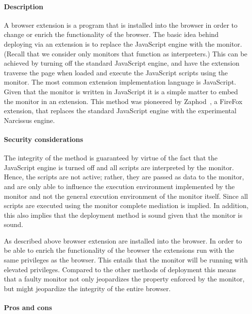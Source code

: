 \documentclass{llncs}
\begin{document}
\paragraph{Description}

A browser extension is a program that is installed into the browser in order to
change or enrich the functionality of the browser.  The basic idea behind
deploying via an extension is to replace the JavaScript engine with the monitor.
(Recall that we consider only monitors that function as interpreters.)
%
This can be achieved by turning off the standard JavaScript engine, and have
the extension traverse the page when loaded and execute the JavaScript scripts
using the monitor. 
%
The most common extension implementation language is JavaScript. Given that
the monitor is written in JavaScript it is a simple matter to embed the 
monitor in an extension.
This method was pioneered by Zaphod~\cite{Zaphod}, a
FireFox extension, that replaces the standard JavaScript engine with the
experimental Narcissus engine.

\paragraph{Security considerations}

The integrity of the method is guaranteed by virtue of the fact that the
JavaScript engine is turned off and all scripts are interpreted by the monitor.
Hence, the scripts are not active; rather, they are passed as data to the
monitor, and are only able to influence the execution environment implemented
by the monitor and not the general execution environment of the monitor itself.
Since all scripts are executed using the monitor complete mediation is implied.
In addition, this also implies that the deployment method is sound given that
the monitor is sound. 

As described above browser extension are installed into the browser. In order
to be able to enrich the functionality of the browser the extensions run with
the same privileges as the browser. This entails that the monitor will be
running with elevated privileges. Compared to the other methods of deployment
this means that a faulty monitor not only jeopardizes the property enforced by
the monitor, but might jeopardize the integrity of the entire browser.

\paragraph{Pros and cons}
\end{document}
